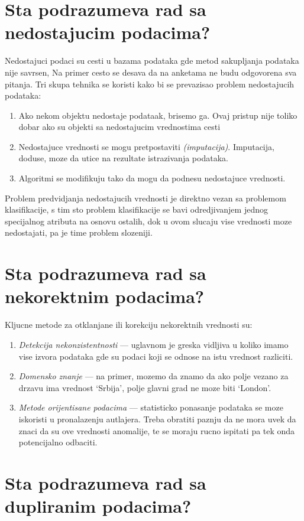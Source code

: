 \documentclass[a4paper]{article}
\begin{document}
\section{Sta podrazumeva rad sa nedostajucim podacima?}
Nedostajuci podaci su cesti u bazama podataka gde metod sakupljanja podataka nije savrsen, Na primer
cesto se desava da na anketama ne budu odgovorena sva pitanja. Tri skupa tehnika se koristi kako bi
se prevazisao problem nedostajucih podataka:
\begin{enumerate}
    \item Ako nekom objektu nedostaje podataak, brisemo ga. Ovaj pristup nije toliko dobar ako su
        objekti sa nedostajucim vrednostima cesti
    \item Nedostajuce vrednosti se mogu pretpostaviti \emph{(imputacija)}. Imputacija, doduse, moze
        da utice na rezultate istrazivanja podataka.
    \item Algoritmi se modifikuju tako da mogu da podnesu nedostajuce vrednosti.
\end{enumerate}
Problem predvidjanja nedostajucih vrednosti je direktno vezan sa problemom klasifikacije, s tim sto
problem klasifikacije se bavi odredjivanjem jednog specijalnog atributa na osnovu ostalih, dok u
ovom slucaju vise vrednosti moze nedostajati, pa je time problem slozeniji.

\section{Sta podrazumeva rad sa nekorektnim podacima?}
Kljucne metode za otklanjane ili korekciju nekorektnih vrednosti su:
\begin{enumerate}
    \item \emph{Detekcija nekonzistentnosti} --- uglavnom je greska vidljiva u koliko imamo vise
        izvora podataka gde su podaci koji se odnose na istu vrednost razliciti.
    \item \emph{Domensko znanje} --- na primer, mozemo da znamo da ako polje vezano za drzavu ima
        vrednost `Srbija', polje glavni grad ne moze biti `London'.
    \item \emph{Metode orijentisane podacima} --- statisticko ponasanje podataka se moze iskoristi u
        pronalazenju autlajera. Treba obratiti paznju da ne mora uvek da znaci da su ove vrednosti
        anomalije, te se moraju rucno ispitati pa tek onda potencijalno odbaciti.
\end{enumerate}


\section{Sta podrazumeva rad sa dupliranim podacima?}
\end{document}
